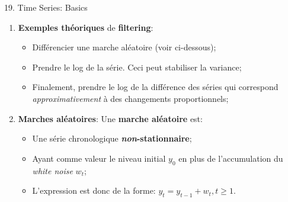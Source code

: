 \documentclass[12pt, titlepage, french]{report}
\begin{document}
\begin{CHPT_SUMM}[label = {timeseries19}]{19. Time Series: Basics}
\begin{enumerate}
\begin{itemize}
		\texttt{[image: src/regime-change-wave.png]}
		\item	Cette idée d'observer des tendances dans des graphiques d'ondes sonores est exactement la même idée que le \textit{time series filtering};
		\item[]	On cherche à identifier des tendances, des cycles, des changements de régime, etc. dans une série pouvant sembler d'être aléatoire;
		\item	Dans le même ordre d'idée, lorsqu'un musicien joue son instrument on imagine que ce n'est pas parfait et qu'il y a un certain niveau d'erreur!
		\item[]	Ceci est donc le \textbf{white noise}, l'erreur aléatoire de la fréquence observée à la fréquence attendue;
		\item[]	Alors, pour néanmoins reconnaître une fréquence d'instrument imparfait, on alloue une variabilité (ou déviance) à la série \og parfaite \fg{};
		\item	La partie inexplicable par les patterns qui demeure est dite d'être \textbf{irréductible} et est donc traitée comme du \textbf{\textit{white noise}};
		\end{itemize}
%		
	\item[]	\label{sec:ex_rand_walk} \textbf{Exemples théoriques} de \textbf{filtering}: 
		\begin{itemize}
		\item	Différencier une marche aléatoire (voir ci-dessous);
		\item	Prendre le log de la série. Ceci peut stabiliser la variance;
		\item	Finalement, prendre le log de la différence des séries qui correspond \textit{approximativement} à des changements proportionnels;
		\end{itemize}
	\item	\textbf{Marches aléatoires}: Une \textbf{marche aléatoire} est:
		\begin{itemize}
		\item	Une série chronologique \textbf{\textit{non}-stationnaire};
		\item	Ayant comme valeur le niveau initial $y_{0}$ en plus de l'accumulation du \textit{white noise} $w_{t}$;
		\item	L'expression est donc de la forme: $y_{t} = y_{t - 1} + w_{t}, t \ge 1$.
		\end{itemize}

\end{enumerate}
\end{CHPT_SUMM}
\end{document}
